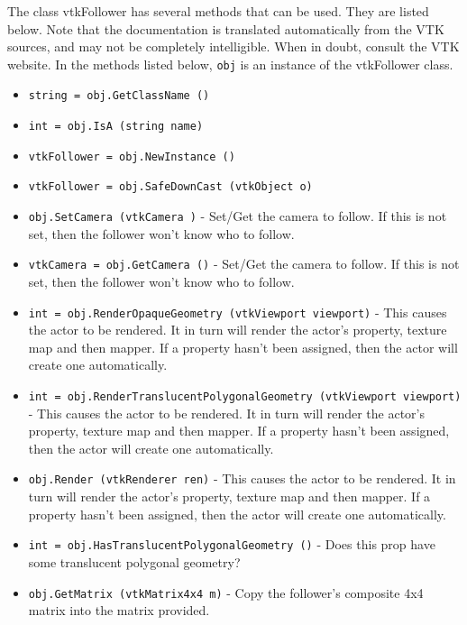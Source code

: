 The class vtkFollower has several methods that can be used.
  They are listed below.
Note that the documentation is translated automatically from the VTK sources,
and may not be completely intelligible.  When in doubt, consult the VTK website.
In the methods listed below, \verb|obj| is an instance of the vtkFollower class.
\begin{itemize}
\item  \verb|string = obj.GetClassName ()|

\item  \verb|int = obj.IsA (string name)|

\item  \verb|vtkFollower = obj.NewInstance ()|

\item  \verb|vtkFollower = obj.SafeDownCast (vtkObject o)|

\item  \verb|obj.SetCamera (vtkCamera )| -  Set/Get the camera to follow. If this is not set, then the follower
 won't know who to follow.

\item  \verb|vtkCamera = obj.GetCamera ()| -  Set/Get the camera to follow. If this is not set, then the follower
 won't know who to follow.

\item  \verb|int = obj.RenderOpaqueGeometry (vtkViewport viewport)| -  This causes the actor to be rendered. It in turn will render the actor's
 property, texture map and then mapper. If a property hasn't been
 assigned, then the actor will create one automatically. 

\item  \verb|int = obj.RenderTranslucentPolygonalGeometry (vtkViewport viewport)| -  This causes the actor to be rendered. It in turn will render the actor's
 property, texture map and then mapper. If a property hasn't been
 assigned, then the actor will create one automatically. 

\item  \verb|obj.Render (vtkRenderer ren)| -  This causes the actor to be rendered. It in turn will render the actor's
 property, texture map and then mapper. If a property hasn't been
 assigned, then the actor will create one automatically. 

\item  \verb|int = obj.HasTranslucentPolygonalGeometry ()| -  Does this prop have some translucent polygonal geometry?

\item  \verb|obj.GetMatrix (vtkMatrix4x4 m)| -  Copy the follower's composite 4x4 matrix into the matrix provided.


\end{itemize}
